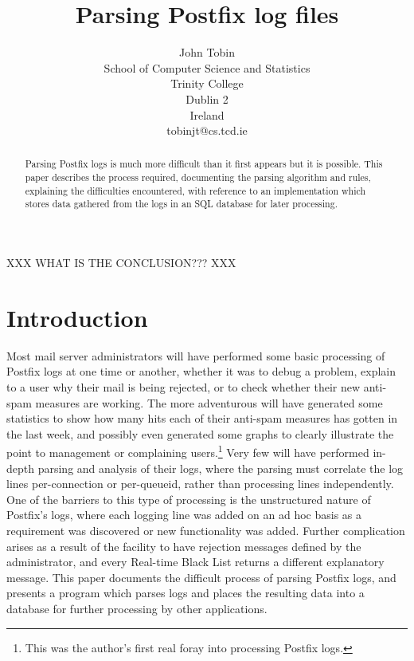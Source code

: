 \documentclass[a4paper,12pt,draft]{article}
\begin{document}
\title{Parsing Postfix log files}
\author{John Tobin \\ School of Computer Science and Statistics \\ 
Trinity College \\ Dublin 2 \\ Ireland \\ tobinjt@cs.tcd.ie}
\date{}
\maketitle

\begin{abstract}

    Parsing Postfix logs is much more difficult than it first appears but
    it is possible.  This paper describes the process required, documenting
    the parsing algorithm and rules, explaining the difficulties
    encountered, with reference to an implementation which stores data
    gathered from the logs in an SQL database for later processing.

\end{abstract}

XXX WHAT IS THE CONCLUSION??? XXX

\newpage
\tableofcontents

\section{Introduction}

Most mail server administrators will have performed some basic processing
of Postfix logs at one time or another, whether it was to debug a problem,
explain to a user why their mail is being rejected, or to check whether
their new anti-spam measures are working.  The more adventurous will have
generated some statistics to show how many hits each of their anti-spam
measures has gotten in the last week, and possibly even generated some
graphs to clearly illustrate the point to management or complaining
users.\footnote{This was the author's first real foray into processing
Postfix logs.}  Very few will have performed in-depth parsing and analysis
of their logs, where the parsing must correlate the log lines
per-connection or per-queueid, rather than processing lines independently.
One of the barriers to this type of processing is the unstructured nature
of Postfix's logs, where each logging line was added on an ad hoc basis as
a requirement was discovered or new functionality was added.  Further
complication arises as a result of the facility to have rejection messages
defined by the administrator, and every Real-time Black List returns a
different explanatory message.  This paper documents the difficult process
of parsing Postfix logs, and presents a program which parses logs and
places the resulting data into a database for further processing by other
applications.
\end{document}
